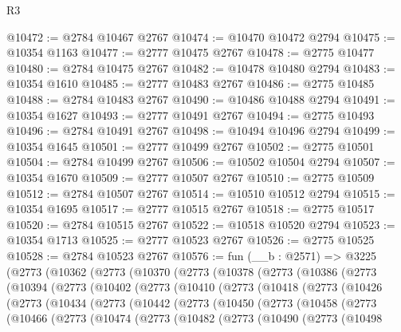 \begin{lexlean}{R3}
\begin{coremodule}
@10472 := @2784 @10467 @2767
@10474 := @10470 @10472 @2794
@10475 := @10354 @1163
@10477 := @2777 @10475 @2767
@10478 := @2775 @10477
@10480 := @2784 @10475 @2767
@10482 := @10478 @10480 @2794
@10483 := @10354 @1610
@10485 := @2777 @10483 @2767
@10486 := @2775 @10485
@10488 := @2784 @10483 @2767
@10490 := @10486 @10488 @2794
@10491 := @10354 @1627
@10493 := @2777 @10491 @2767
@10494 := @2775 @10493
@10496 := @2784 @10491 @2767
@10498 := @10494 @10496 @2794
@10499 := @10354 @1645
@10501 := @2777 @10499 @2767
@10502 := @2775 @10501
@10504 := @2784 @10499 @2767
@10506 := @10502 @10504 @2794
@10507 := @10354 @1670
@10509 := @2777 @10507 @2767
@10510 := @2775 @10509
@10512 := @2784 @10507 @2767
@10514 := @10510 @10512 @2794
@10515 := @10354 @1695
@10517 := @2777 @10515 @2767
@10518 := @2775 @10517
@10520 := @2784 @10515 @2767
@10522 := @10518 @10520 @2794
@10523 := @10354 @1713
@10525 := @2777 @10523 @2767
@10526 := @2775 @10525
@10528 := @2784 @10523 @2767
@10576 := fun (__b : @2571) =>
  @3225
    (@2773
      (@10362
        (@2773
          (@10370
            (@2773
              (@10378
                (@2773
                  (@10386
                    (@2773
                      (@10394
                        (@2773
                          (@10402
                            (@2773
                              (@10410
                                (@2773
                                  (@10418
                                    (@2773
                                      (@10426
                                        (@2773
                                          (@10434
                                            (@2773
                                              (@10442
                                                (@2773
                                                  (@10450
                                                    (@2773
                                                      (@10458
                                                        (@2773
                                                          (@10466
                                                            (@2773
                                                              (@10474
                                                                (@2773
                                                                  (@10482
                                                                    (@2773
                                                                      (@10490
                                                                        (@2773
                                                                          (@10498

\end{coremodule}
\end{lexlean}
